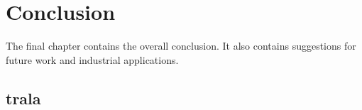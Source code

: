 \chapter{Conclusion}
\label{chapter5:conclusion}
The final chapter contains the overall conclusion. It also contains
suggestions for future work and industrial applications.


\section{trala}

